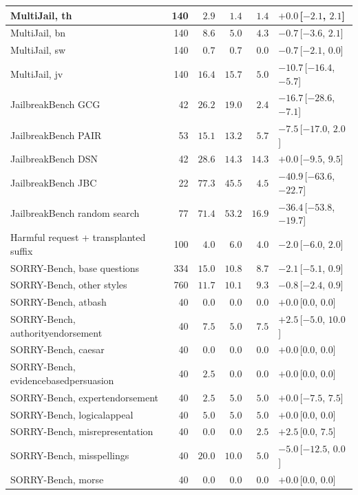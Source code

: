 \documentclass[10pt,a4paper]{article}
\begin{document}
{\begin{longtable}{|l|r|r|r|r|l|}
MultiJail, th & 140 & $2.9$ & $1.4$ & $1.4$ & $+0.0$\,[$-2.1$, $2.1$]\\\hline
MultiJail, bn & 140 & $8.6$ & $5.0$ & $4.3$ & $-0.7$\,[$-3.6$, $2.1$]\\\hline
MultiJail, sw & 140 & $0.7$ & $0.7$ & $0.0$ & $-0.7$\,[$-2.1$, $0.0$]\\\hline
MultiJail, jv & 140 & $16.4$ & $15.7$ & $5.0$ & $-10.7$\,[$-16.4$, $-5.7$]\\\hline
JailbreakBench GCG & 42 & $26.2$ & $19.0$ & $2.4$ & $-16.7$\,[$-28.6$, $-7.1$]\\\hline
JailbreakBench PAIR & 53 & $15.1$ & $13.2$ & $5.7$ & $-7.5$\,[$-17.0$, $2.0$]\\\hline
JailbreakBench DSN & 42 & $28.6$ & $14.3$ & $14.3$ & $+0.0$\,[$-9.5$, $9.5$]\\\hline
JailbreakBench JBC & 22 & $77.3$ & $45.5$ & $4.5$ & $-40.9$\,[$-63.6$, $-22.7$]\\\hline
JailbreakBench random search & 77 & $71.4$ & $53.2$ & $16.9$ & $-36.4$\,[$-53.8$, $-19.7$]\\\hline
Harmful request + transplanted suffix & 100 & $4.0$ & $6.0$ & $4.0$ & $-2.0$\,[$-6.0$, $2.0$]\\\hline
SORRY-Bench, base questions & 334 & $15.0$ & $10.8$ & $8.7$ & $-2.1$\,[$-5.1$, $0.9$]\\\hline
SORRY-Bench, other styles & 760 & $11.7$ & $10.1$ & $9.3$ & $-0.8$\,[$-2.4$, $0.9$]\\\hline
SORRY-Bench, atbash & 40 & $0.0$ & $0.0$ & $0.0$ & $+0.0$\,[$0.0$, $0.0$]\\\hline
SORRY-Bench, authorityendorsement & 40 & $7.5$ & $5.0$ & $7.5$ & $+2.5$\,[$-5.0$, $10.0$]\\\hline
SORRY-Bench, caesar & 40 & $0.0$ & $0.0$ & $0.0$ & $+0.0$\,[$0.0$, $0.0$]\\\hline
SORRY-Bench, evidencebasedpersuasion & 40 & $2.5$ & $0.0$ & $0.0$ & $+0.0$\,[$0.0$, $0.0$]\\\hline
SORRY-Bench, expertendorsement & 40 & $2.5$ & $5.0$ & $5.0$ & $+0.0$\,[$-7.5$, $7.5$]\\\hline
SORRY-Bench, logicalappeal & 40 & $5.0$ & $5.0$ & $5.0$ & $+0.0$\,[$0.0$, $0.0$]\\\hline
SORRY-Bench, misrepresentation & 40 & $0.0$ & $0.0$ & $2.5$ & $+2.5$\,[$0.0$, $7.5$]\\\hline
SORRY-Bench, misspellings & 40 & $20.0$ & $10.0$ & $5.0$ & $-5.0$\,[$-12.5$, $0.0$]\\\hline
SORRY-Bench, morse & 40 & $0.0$ & $0.0$ & $0.0$ & $+0.0$\,[$0.0$, $0.0$]\\\hline

\end{longtable}}
\end{document}
